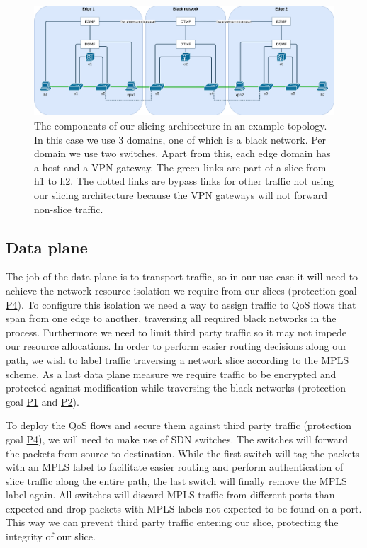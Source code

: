 \begin{landscape}
\begin{figure}[ht]
        \centering
        \includegraphics[width=\linewidth]{images/chapter_5/topology.png}
        \caption[Slicing architecture components]{The components of our slicing architecture in an example topology. In this case we use 3 domains, one of which is a black network. Per domain we use two switches. Apart from this, each edge domain has a host and a VPN gateway. The green links are part of a slice from h1 to h2. The dotted links are bypass links for other traffic not using our slicing architecture because the VPN gateways will not forward non-slice traffic.}
        \label{fig:topology}
\end{figure}
\end{landscape}

\subsection{Data plane}
The job of the data plane is to transport traffic, so in our use case it will need to achieve the network resource isolation we require from our slices (protection goal \hyperref[P4]{P4}). To configure this isolation we need a way to assign traffic to QoS flows that span from one edge to another, traversing all required black networks in the process. Furthermore we need to limit third party traffic so it may not impede our resource allocations. In order to perform easier routing decisions along our path, we wish to label traffic traversing a network slice according to the MPLS scheme. As a last data plane measure we require traffic to be encrypted and protected against modification while traversing the black networks (protection goal \hyperref[P1]{P1} and \hyperref[P2]{P2}).

To deploy the QoS flows and secure them against third party traffic (protection goal \hyperref[P4]{P4}), we will need to make use of SDN switches. The switches will forward the packets from source to destination. While the first switch will tag the packets with an MPLS label to facilitate easier routing and perform authentication of slice traffic along the entire path, the last switch will finally remove the MPLS label again. All switches will discard MPLS traffic from different ports than expected and drop packets with MPLS labels not expected to be found on a port. This way we can prevent third party traffic entering our slice, protecting the integrity of our slice.

